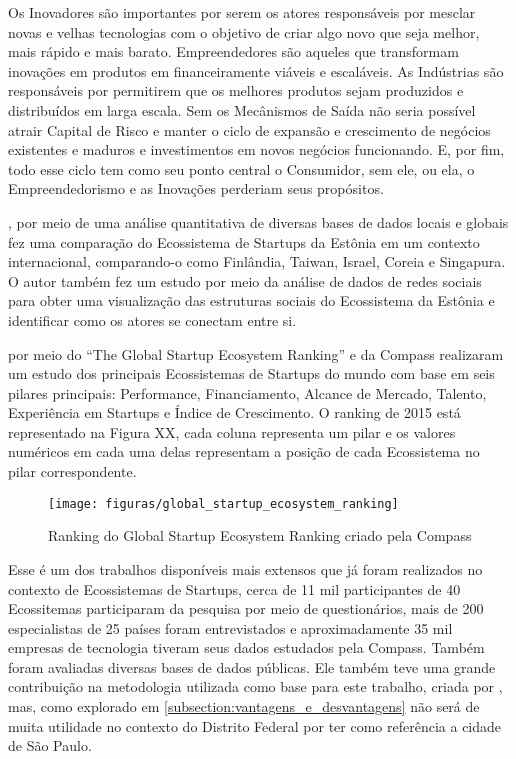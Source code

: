 Os Inovadores são importantes por serem os atores responsáveis por mesclar novas e velhas tecnologias com o objetivo de criar algo novo que seja melhor, mais rápido e mais barato. Empreendedores são aqueles que transformam inovações em produtos em financeiramente viáveis e escaláveis. As Indústrias são responsáveis por permitirem que os melhores produtos sejam produzidos e distribuídos em larga escala. Sem os Mecânismos de Saída não seria possível atrair Capital de Risco e manter o ciclo de expansão e crescimento de negócios existentes e maduros e investimentos em novos negócios funcionando. E, por fim, todo esse ciclo tem como seu ponto central o Consumidor, sem ele, ou ela, o Empreendedorismo e as Inovações perderiam seus propósitos.

, por meio de uma análise quantitativa de diversas bases de dados locais e globais fez uma comparação do Ecossistema de Startups da Estônia em um contexto internacional, comparando-o como Finlândia, Taiwan, Israel, Coreia e Singapura. O autor também fez um estudo por meio da análise de dados de redes sociais para obter uma visualização das estruturas sociais do Ecossistema da Estônia e identificar como os atores se conectam entre si.

 por meio do ``The Global Startup Ecosystem Ranking'' e da Compass realizaram um estudo dos principais Ecossistemas de Startups do mundo com base em seis pilares principais: Performance, Financiamento, Alcance de Mercado, Talento, Experiência em Startups e Índice de Crescimento. O ranking de 2015 está representado na Figura XX, cada coluna representa um pilar e os valores numéricos em cada uma delas representam a posição de cada Ecossistema no pilar correspondente. 

\begin{figure}[!htb]
\centering
\texttt{[image: figuras/global\_startup\_ecosystem\_ranking]}
\caption{Ranking do Global Startup Ecosystem Ranking criado pela Compass}
\label{figure:global_startup_ecosystem_ranking}
\end{figure}

Esse é um dos trabalhos disponíveis mais extensos que já foram realizados no contexto de Ecossistemas de Startups, cerca de 11 mil participantes de 40 Ecossitemas participaram da pesquisa por meio de questionários, mais de 200 especialistas de 25 países foram entrevistados e aproximadamente 35 mil empresas de tecnologia tiveram seus dados estudados pela Compass. Também foram avaliadas diversas bases de dados públicas. Ele também teve uma grande contribuição na metodologia utilizada como base para este trabalho, criada por , mas, como explorado em \ref{subsection:vantagens_e_desvantagens} não será de muita utilidade no contexto do Distrito Federal por ter como referência a cidade de São Paulo.

